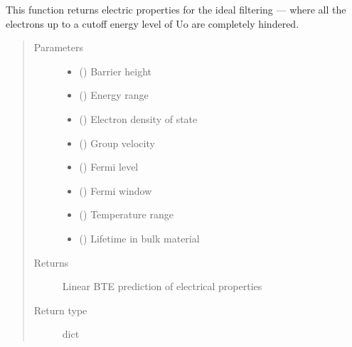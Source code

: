 \documentclass[letterpaper,10pt,english]{sphinxmanual}
\begin{document}
\begin{fulllineitems}
\label{\detokenize{autosummary/ThermoElectric.filtering_effect:ThermoElectric.filtering_effect}}
\sphinxAtStartPar
This function returns electric properties for the ideal filtering —  where all the electrons up to a cutoff energy
level of Uo are completely hindered.
\begin{quote}\begin{description}
\item[{Parameters}] \leavevmode\begin{itemize}
\item {} 
\sphinxAtStartPar
{} () \textendash{} Barrier height

\item {} 
\sphinxAtStartPar
{} () \textendash{} Energy range

\item {} 
\sphinxAtStartPar
{} () \textendash{} Electron density of state

\item {} 
\sphinxAtStartPar
{} () \textendash{} Group velocity

\item {} 
\sphinxAtStartPar
{} () \textendash{} Fermi level

\item {} 
\sphinxAtStartPar
{} () \textendash{} Fermi window

\item {} 
\sphinxAtStartPar
{} () \textendash{} Temperature range

\item {} 
\sphinxAtStartPar
{} () \textendash{} Lifetime in bulk material

\end{itemize}

\item[{Returns}] \leavevmode
\sphinxAtStartPar
{} \textendash{} Linear BTE prediction of electrical properties

\item[{Return type}] \leavevmode
\sphinxAtStartPar
dict

\end{description}\end{quote}

\end{fulllineitems}
\end{document}

